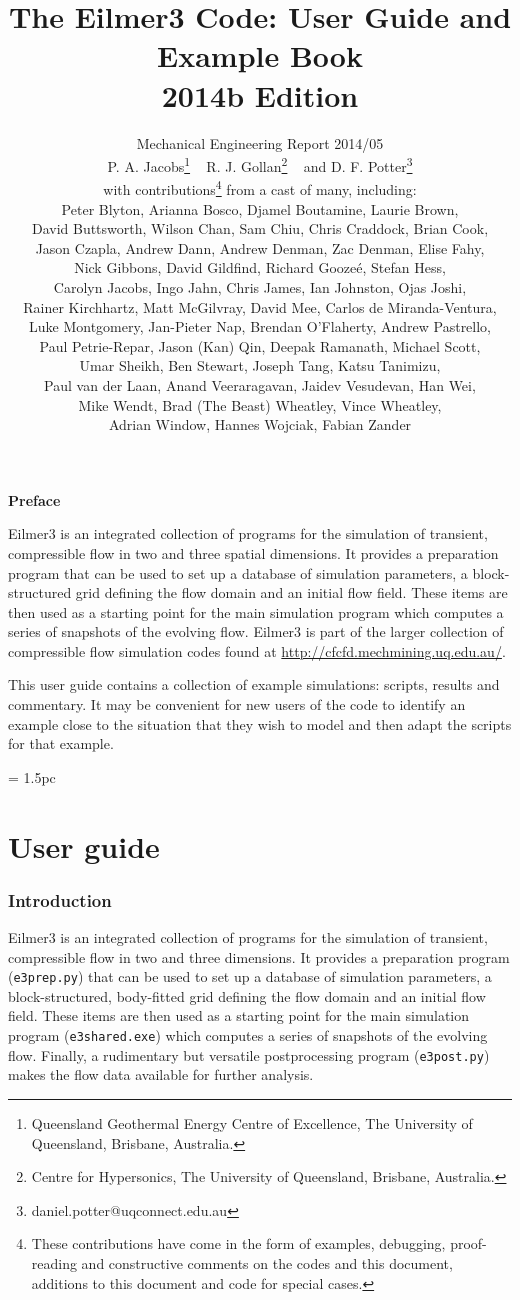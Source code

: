 \documentclass[12pt,a4paper,twoside]{article}
\title{
    The Eilmer3 Code: User Guide and Example Book\\
    2014b Edition
}
\author{
    Mechanical Engineering Report 2014/05\\
    P. A. Jacobs\thanks{Queensland Geothermal Energy Centre of Excellence, The University of Queensland, Brisbane, Australia.} 
    ~ R. J. Gollan\thanks{Centre for Hypersonics, The University of Queensland, Brisbane, Australia.}
    ~ and
    D. F. Potter\thanks{daniel.potter@uqconnect.edu.au}\\
    {\normalsize with contributions\thanks{These contributions have come in the form of examples, debugging, 
    proof-reading and constructive comments on the codes and this document, 
    additions to this document and code for special cases.}
    from a cast of many, including:}\\
    {\normalsize Peter Blyton,}
    {\normalsize Arianna Bosco,}
    {\normalsize Djamel Boutamine,}
    {\normalsize Laurie Brown,} \\
    {\normalsize David Buttsworth,}
    {\normalsize Wilson Chan,} 
    {\normalsize Sam Chiu,}
    {\normalsize Chris Craddock,} 
    {\normalsize Brian Cook,} \\ 
    {\normalsize Jason Czapla,}
    {\normalsize Andrew Dann,}  
    {\normalsize Andrew Denman,}
    {\normalsize Zac Denman,}
    {\normalsize Elise Fahy,} \\
    {\normalsize Nick Gibbons,} 
    {\normalsize David Gildfind,} 
    {\normalsize Richard Gooze\'{e},}
    {\normalsize Stefan Hess,} \\
    {\normalsize Carolyn Jacobs,} 
    {\normalsize Ingo Jahn,} 
    {\normalsize Chris James,}
    {\normalsize Ian Johnston,}
    {\normalsize Ojas Joshi,} \\
    {\normalsize Rainer Kirchhartz,} 
    {\normalsize Matt McGilvray,} 
    {\normalsize David Mee,} 
    {\normalsize Carlos de Miranda-Ventura,} \\
    {\normalsize Luke Montgomery,} 
    {\normalsize Jan-Pieter Nap,} 
    {\normalsize Brendan O'Flaherty,} 
    {\normalsize Andrew Pastrello,} \\
    {\normalsize Paul Petrie-Repar,} 
    {\normalsize Jason (Kan) Qin,} 
    {\normalsize Deepak Ramanath,} 
    {\normalsize Michael Scott,} \\
    {\normalsize Umar Sheikh,} 
    {\normalsize Ben Stewart,} 
    {\normalsize Joseph Tang,} 
    {\normalsize Katsu Tanimizu,} \\
    {\normalsize Paul van der Laan,} 
    {\normalsize Anand Veeraragavan,} 
    {\normalsize Jaidev Vesudevan,} 
    {\normalsize Han Wei,} \\
    {\normalsize Mike Wendt,} 
    {\normalsize Brad (The Beast) Wheatley,} 
    {\normalsize Vince Wheatley,} \\
    {\normalsize Adrian Window,} 
    {\normalsize Hannes Wojciak,}
    {\normalsize Fabian Zander}
}
\begin{document}
\maketitle

\centerline{\textbf{Preface}}
Eilmer3 is an integrated collection of programs for the simulation of transient,
compressible flow in two and three spatial dimensions.
It provides a preparation program that can be used to set up a database of
simulation parameters, a block-structured grid defining the flow domain and an
initial flow field.
These items are then used as a starting point for the main simulation program
which computes a series of snapshots of the evolving flow.
Eilmer3 is part of the larger collection of compressible flow simulation codes
found at \url{http://cfcfd.mechmining.uq.edu.au/}.

\medskip
This user guide contains a collection of example simulations: scripts, results
and commentary.
It may be convenient for new users of the code to identify an example
close to the situation that they wish to model and then adapt the 
scripts for that example.

\cleardoublepage
\tableofcontents

\cleardoublepage
\baselineskip = 1.5pc

\part{User guide}

\section{Introduction}
%
Eilmer3 is an integrated collection of programs for the simulation of transient,
compressible flow in two and three dimensions.
It provides a preparation program (\texttt{e3prep.py}) that can be used to set up a database of
simulation parameters, a block-structured, body-fitted grid defining the flow domain and an
initial flow field.
These items are then used as a starting point for the main simulation program (\texttt{e3shared.exe})
which computes a series of snapshots of the evolving flow.
Finally, a rudimentary but versatile postprocessing program (\texttt{e3post.py}) makes the flow data
available for further analysis.
\end{document}
